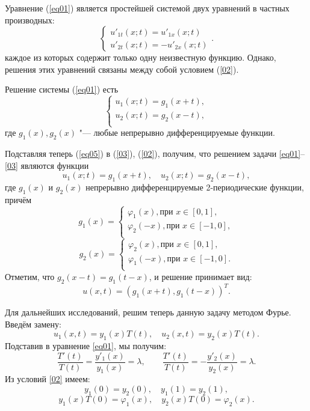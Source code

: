 Уравнение (\ref{eq01}) является простейшей системой двух уравнений в
частных производных:
\begin{equation*}
\begin{cases}
   u'_{1t}(x;t) = u'_{1x}(x;t)\\
   u'_{2t}(x;t) = -u'_{2x}(x;t)
 \end{cases}.
\end{equation*}
 каждое из которых содержит только одну
неизвестную функцию.  Однако, решения этих уравнений связаны между
собой условием (\ref{02}).

Решение  системы (\ref{eq01}) есть
\begin{equation} \label{eq05}
 \begin{cases}
   u_{1}(x;t) = g_{1}(x+t),\\
   u_{2}(x;t) =g_{2} (x-t), \\
 \end{cases}
\end{equation}
где $g_{1}(x), g_{2}(x)$ "--- любые непрерывно дифференцируемые функции. %

Подставляя теперь (\ref{eq05}) в (\ref{03}), (\ref{02}), получим,
что решением задачи \eqref{eq01}--\eqref{03} являются функции
\begin{equation*}
   u_{1}(x;t) = g_{1}(x+t), \quad u_{2}(x;t) =g_{2} (x-t),
\end{equation*}
где $g_{1}(x)$ и $g_{2}(x)$ непрерывно дифференцируемые
2-периодические функции, причём
$$g_{1}(x)=
\begin{cases}
    \varphi_{1}(x), \text{при } x\in [0,1],\\
     \varphi_{2} (-x), \text{при } x\in [-1,0],\\
 \end{cases}
$$
$$
g_{2}(x)=
\begin{cases}
    \varphi_{2}(x), \text{при } x\in [0,1],\\
     \varphi_{1} (-x), \text{при } x\in [-1,0].\\
 \end{cases}
 $$
Отметим, что    $g_2(x-t)=g_1(t-x)$, и решение принимает вид:
\begin{equation}\label{reshD}
u (x,t)=(g_1(x+t), g_1(t-x))^T.
\end{equation}

Для дальнейших исследований, решим теперь данную задачу методом
Фурье. Введём замену:
\begin{equation}\label{zamena1}
   u_{1}(x,t)=y_{1}(x)T(t), \quad u_{2}(x,t)=y_{2}(x)T(t).
\end{equation}
Подставив в   уравнение \eqref{eq01}, мы получим:
\begin{equation*}
   \frac{T'(t)}{T(t)}= \frac{y'_{1}(x)}{y_{1}(x)}=\lambda, \qquad
\frac{T'(t)}{T(t)}=
-\frac{y'_{2}(x)}{y_{2}(x)}=\lambda.\end{equation*} Из условий
\eqref{02} имеем:
\begin{equation*}
   y_{1}(0)= y_{2}(0), \quad y_{1}(1)= y_{2}(1),
\end{equation*}
\begin{equation*}
y_{1}(x)T(0)= \varphi_{1}(x),\quad y_{2}(x)T(0)= \varphi_{2}(x).
\end{equation*}


